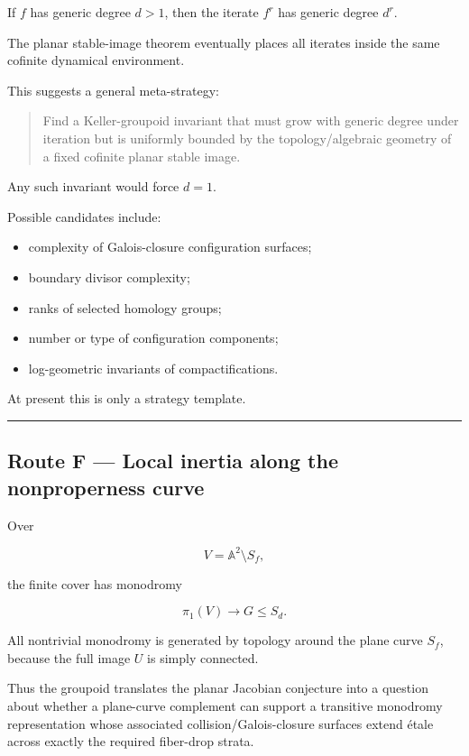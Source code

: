 If \(f\) has generic degree \(d>1\), then the iterate \(f^r\) has
generic degree \(d^r\).

The planar stable-image theorem eventually places all iterates inside
the same cofinite dynamical environment.

This suggests a general meta-strategy:

\begin{quote}
Find a Keller-groupoid invariant that must grow with generic degree
under iteration but is uniformly bounded by the topology/algebraic
geometry of a fixed cofinite planar stable image.
\end{quote}

Any such invariant would force \(d=1\).

Possible candidates include:

\begin{itemize}
\tightlist
\item
  complexity of Galois-closure configuration surfaces;
\item
  boundary divisor complexity;
\item
  ranks of selected homology groups;
\item
  number or type of configuration components;
\item
  log-geometric invariants of compactifications.
\end{itemize}

At present this is only a strategy template.

\begin{center}\rule{0.5\linewidth}{0.5pt}\end{center}

\subsection{Route F --- Local inertia along the nonproperness
curve}\label{route-f-local-inertia-along-the-nonproperness-curve}

Over

\[
V=\mathbb A^2\setminus S_f,
\]

the finite cover has monodromy

\[
\pi_1(V)\to G\le S_d.
\]

All nontrivial monodromy is generated by topology around the plane curve
\(S_f\), because the full image \(U\) is simply connected.

Thus the groupoid translates the planar Jacobian conjecture into a
question about whether a plane-curve complement can support a transitive
monodromy representation whose associated collision/Galois-closure
surfaces extend étale across exactly the required fiber-drop strata.

